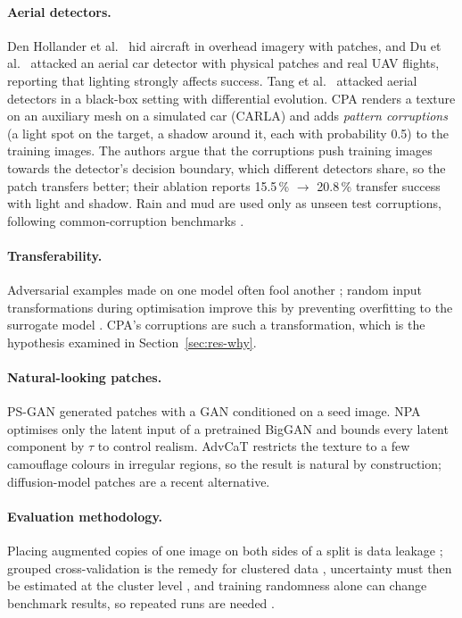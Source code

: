 \documentclass[11pt,a4paper]{article}
\begin{document}
\paragraph{Aerial detectors.} Den Hollander et al.\ \cite{denhollander2020} hid aircraft in overhead imagery with patches, and Du et al.\ \cite{du2022aerial} attacked an aerial car detector with physical patches and real UAV flights, reporting that lighting strongly affects success. Tang et al.\ \cite{tang2024de} attacked aerial detectors in a black-box setting with differential evolution. CPA \cite{zhang2024cpa} renders a texture on an auxiliary mesh on a simulated car (CARLA) and adds \emph{pattern corruptions} (a light spot on the target, a shadow around it, each with probability 0.5) to the training images. The authors argue that the corruptions push training images towards the detector's decision boundary, which different detectors share, so the patch transfers better; their ablation reports 15.5\,\% $\to$ 20.8\,\% transfer success with light and shadow. Rain and mud are used only as unseen test corruptions, following common-corruption benchmarks \cite{hendrycks2019}.

\paragraph{Transferability.} Adversarial examples made on one model often fool another \cite{liu2017transfer}; random input transformations during optimisation improve this by preventing overfitting to the surrogate model \cite{xie2019di}. CPA's corruptions are such a transformation, which is the hypothesis examined in Section~\ref{sec:res-why}.

\paragraph{Natural-looking patches.} PS-GAN \cite{liu2019psgan} generated patches with a GAN conditioned on a seed image. NPA \cite{hu2021npa} optimises only the latent input of a pretrained BigGAN \cite{brock2019} and bounds every latent component by $\tau$ to control realism. AdvCaT \cite{hu2023advcat} restricts the texture to a few camouflage colours in irregular regions, so the result is natural by construction; diffusion-model patches \cite{lin2023diffusion} are a recent alternative.

\paragraph{Evaluation methodology.} Placing augmented copies of one image on both sides of a split is data leakage \cite{kaufman2012}; grouped cross-validation is the remedy for clustered data \cite{roberts2017}, uncertainty must then be estimated at the cluster level \cite{field2007}, and training randomness alone can change benchmark results, so repeated runs are needed \cite{bouthillier2021}.
\end{document}
